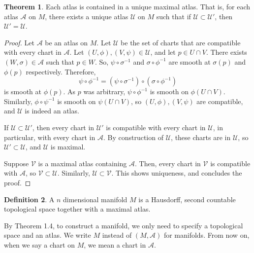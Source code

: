 \documentclass[]{article}
\theoremstyle{definition}
\newtheorem{theorem}{Theorem}[section] %
\theoremstyle{definition}
\newtheorem{definition}[theorem]{Definition} %
\begin{document}
\begin{theorem}
    Each atlas is contained in a unique maximal atlas. That is, for each atlas $\mathcal{A}$ on $M$, there exists a unique atlas $\mathcal{U}$ on $M$ such that if $\mathcal{U}\subset\mathcal{U}'$, then $\mathcal{U}'=\mathcal{U}$.
\end{theorem}

\begin{proof}
    Let $\mathcal{A}$ be an atlas on $M$. Let $\mathcal{U}$ be the set of charts that are compatible with every chart in $\mathcal{A}$. Let $(U, \phi), (V, \psi)\in \mathcal{U}$, and let $p\in U\cap V$. There exists $(W, \sigma)\in \mathcal{A}$ such that $p\in W$. So, $\psi\circ\sigma^{-1}$ and $\sigma\circ\phi^{-1}$ are smooth at $\sigma(p)$ and $\phi(p)$ respectively. Therefore, \[\psi\circ\phi^{-1} = (\psi\circ\sigma^{-1})\circ(\sigma\circ\phi^{-1})\] is smooth at $\phi(p)$. As $p$ was arbitrary, $\psi\circ\phi^{-1}$ is smooth on $\phi(U\cap V)$. Similarly, $\phi\circ\psi^{-1}$ is smooth on $\psi(U\cap V)$, so $(U, \phi), (V, \psi)$ are compatible, and $\mathcal{U}$ is indeed an atlas.
    
    If $\mathcal{U}\subset \mathcal{U}'$, then every chart in $\mathcal{U}'$ is compatible with every chart in $\mathcal{U}$, in particular, with every chart in $\mathcal{A}$. By construction of $\mathcal{U}$, these charts are in $\mathcal{U}$, so $\mathcal{U}'\subset \mathcal{U}$, and $\mathcal{U}$ is maximal.

    Suppose $\mathcal{V}$ is a maximal atlas containing $\mathcal{A}$. Then, every chart in $\mathcal{V}$ is compatible with $\mathcal{A}$, so $\mathcal{V}\subset \mathcal{U}$. Similarly, $\mathcal{U}\subset \mathcal{V}$. This shows uniqueness, and concludes the proof.
\end{proof}

\begin{definition}
    A $n$ dimensional manifold $M$ is a Hausdorff, second countable topological space together with a maximal atlas.
\end{definition}

By Theorem 1.4, to construct a manifold, we only need to specify a topological space and an atlas. We write $M$ instead of $(M, \mathcal{A})$ for manifolds. From now on, when we say a chart on $M$, we mean a chart in $\mathcal{A}$.
\end{document}
